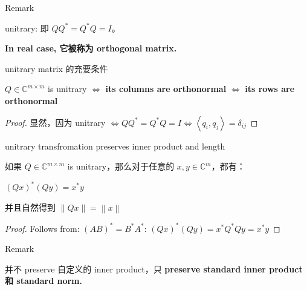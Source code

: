 \begin{qlremark}{Remark}

unitrary: 即 \(QQ^{\ast} = Q^{\ast}Q = I\)。

\textbf{In real case, 它被称为 orthogonal matrix.}

\end{qlremark}

\begin{theorem}{unitrary matrix 的充要条件}

\(Q \in \mathbb{C}^{m \times m}\) is unitrary \(\Leftrightarrow\) \textbf{its columns are orthonormal} \(\Leftrightarrow\) \textbf{its rows are orthonormal}

\end{theorem}

\begin{proof}

显然，因为 unitrary \(\Leftrightarrow QQ^{\ast} = Q^{\ast}Q = I\Leftrightarrow\left\langle {q_{i},q_{j}} \right\rangle = \delta_{ij}\)

\end{proof}

\begin{theorem}{unitrary transfromation preserves inner product and length}

如果 \(Q \in \mathbb{C}^{m \times m}\) is unitrary，那么对于任意的 \(x,y \in \mathbb{C}^{m}\)，都有：

\(\left( {Qx} \right)^{\ast}\left( {Qy} \right) = x^{\ast}y\)

并且自然得到 \(\left\| {Qx} \right\| = \left\| x \right\|\)

\end{theorem}

\begin{proof}

Follows from: \(\left( {AB} \right)^{\ast} = B^{\ast}A^{\ast}\): \(\left( {Qx} \right)^{\ast}\left( {Qy} \right) = x^{\ast}Q^{\ast}Qy = x^{\ast}y\)

\end{proof}

\begin{qlremark}{Remark}

并不 preserve 自定义的 inner product，只 \textbf{preserve standard inner product 和 standard norm.}

\end{qlremark}
